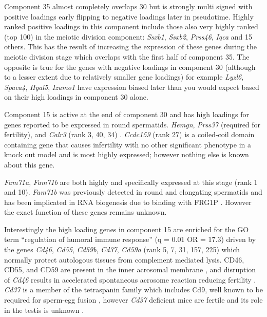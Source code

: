 Component 35 almost completely overlaps 30 but is strongly multi signed with positive loadings early flipping to negative loadings later in pseudotime. Highly ranked positive loadings in this component include those also very highly ranked (top 100) in the meiotic division component: \textit{Ssxb1}, \textit{Ssxb2}, \textit{Prss46}, \textit{Iqca} and 15 others. This has the result of increasing the expression of these genes during the meiotic division stage which overlaps with the first half of component 35. The opposite is true for the genes with negative loadings in component 30 (although to a lesser extent due to relatively smaller gene loadings) for example \textit{Lyzl6}, \textit{Spaca4}, \textit{Hyal5}, \textit{Izumo1} have expression biased later than you would expect based on their high loadings in component 30 alone.

Component 15 is active at the end of component 30 and has high loadings for genes reported to be expressed in round spermatids. \textit{Hemgn}, \textit{Prss37} (required for fertility), and \textit{Calr3} (rank 3, 40, 34) \parencite{Shen2013Prss37}. \textit{Ccdc159} (rank 27) is a coiled-coil domain containing gene that causes infertility with no other significant phenotype in a knock out model and is most highly expressed; however nothing else is known about this gene.

\textit{Fam71a}, \textit{Fam71b} are both highly and specifically expressed at this stage (rank 1 and 10). \textit{Fam71b} was previously detected in round and elongating spermatids \parencite{Petit2015Combining} and has been implicated in RNA biogenesis due to binding with FRG1P \parencite{vanKoningsbruggen2007FRG1Pmediated}. However the exact function of these genes remains unknown.

Interestingly the high loading genes in component 15 are enriched for the GO term ``regulation of humoral immune response'' (q = 0.01 OR = 17.3) driven by the genes \textit{Cd46}, \textit{Cd55}, \textit{Cd59b}, \textit{Cd37}, \textit{Cd59a} (rank 5, 7, 31, 157, 225) which normally protect autologous tissues from complement mediated lysis. CD46, CD55, and CD59 are present in the inner acrosomal membrane \parencite{Cummerson2006complement}, and disruption of \textit{Cd46} results in accelerated spontaneous acrosome reaction reducing fertility \parencite{Inoue2003Disruption}. \textit{Cd37} is a member of the tetraspanin family which includes Cd9, well known to be required for sperm-egg fusion \parencite{Kaji2000gamete, Naour2000Severely, Miyado2000Requirement}, however \textit{Cd37} deficient mice are fertile and its role in the testis is unknown \parencite{Knobeloch2000Targeted}.

